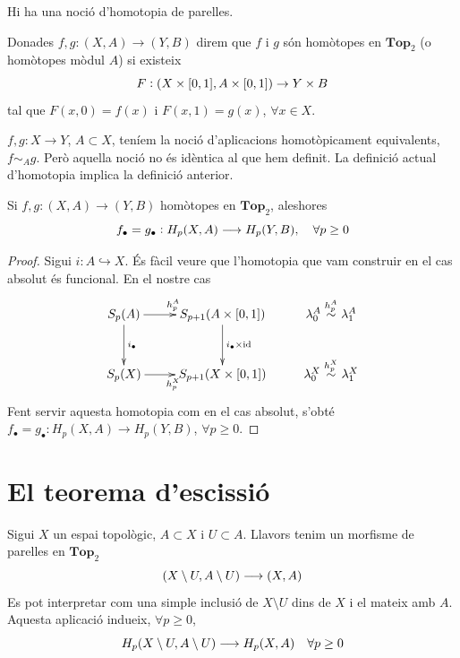 \documentclass[../main.tex]{subfiles}
\begin{document}
Hi ha una noció d'homotopia de parelles. 
\begin{defi}
Donades $f,g:(X,A)\rightarrow (Y,B)$ direm que $f$ i $g$ són homòtopes en $\mathbf{Top}_2$ (o homòtopes mòdul $A$) si existeix
\begin{equation}
    \notag
    F:(X\times [0,1],A\times [0,1])\rightarrow Y\times B
\end{equation}
tal que $F(x,0) = f(x)$ i $F(x,1) = g(x)$, $\forall x\in X$.
\end{defi}


\begin{nota}
$f,g:X\rightarrow Y$, $A\subset X$, teníem la noció d'aplicacions homotòpicament equivalents, $f\sim_A g$. Però aquella noció no és idèntica al que hem definit. La definició actual d'homotopia implica la definició anterior.
\end{nota}

\begin{ter}
\label{ter:invarianciahomotopicadeparelles} Si $f,g:(X,A)\rightarrow (Y,B)$ homòtopes en $\mathbf{Top}_2$, aleshores
\begin{equation}
    \notag
    f_\bullet = g_\bullet:H_p(X,A)\longrightarrow H_p(Y,B),\quad \forall p\geq 0  
\end{equation}
\end{ter}
\begin{proof}
Sigui $i:A\hookrightarrow X$. És fàcil veure que l'homotopia que vam construir en el cas absolut és funcional. En el nostre cas
\begin{equation}
    \notag
    \xymatrix{
    S_p(A)\ar[d]^{i_\bullet} \ar[r]^{h_p^{A}}&  S_{p+1}(A\times [0,1])\ar[d]^{i_\bullet\times \mathrm{id}} &  \lambda_0^{A}\overset{h_p^{A}}{\sim} \lambda_1^{A}\\
    S_p(X) \ar[r]_{h_p^X} & S_{p+1}(X\times [0,1]) & \lambda_0^X\overset{h_p^X}{\sim}\lambda_1^X
    }
\end{equation}
Fent servir aquesta homotopia com en el cas absolut, s'obté $f_\bullet = g_\bullet:H_p(X,A)\rightarrow H_p(Y,B)$, $\forall p\geq 0$.
\end{proof}

\section{El teorema d'escissió}

Sigui $X$ un espai topològic, $A\subset X$ i $U\subset A$. Llavors tenim un morfisme de parelles en $\mathbf{Top}_2$
\begin{equation}
    \notag
    (X\setminus U,A\setminus U)\longrightarrow(X,A)
\end{equation}
Es pot interpretar com una simple inclusió de $X\setminus U$ dins de $X$ i el mateix amb $A$. Aquesta aplicació indueix, $\forall p\geq 0$, 
\begin{equation}
    \notag
    H_p(X\setminus U,A\setminus U)\longrightarrow H_p(X,A)\quad \forall p\geq 0
\end{equation}
\end{document}
